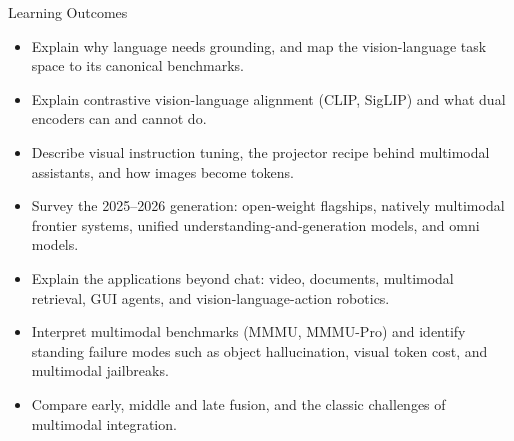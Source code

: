 \begin{frame}{Learning Outcomes}
  \begin{itemize}
    \item Explain why language needs grounding, and map the vision-language task space to its canonical
      benchmarks.
    \item Explain contrastive vision-language alignment (CLIP, SigLIP) and what dual encoders can and
      cannot do.
    \item Describe visual instruction tuning, the projector recipe behind multimodal assistants, and how
      images become tokens.
    \item Survey the 2025--2026 generation: open-weight flagships, natively multimodal frontier systems,
      unified understanding-and-generation models, and omni models.
    \item Explain the applications beyond chat: video, documents, multimodal retrieval, GUI agents, and
      vision-language-action robotics.
    \item Interpret multimodal benchmarks (MMMU, MMMU-Pro) and identify standing failure modes such as
      object hallucination, visual token cost, and multimodal jailbreaks.
    \item Compare early, middle and late fusion, and the classic challenges of multimodal integration.
  \end{itemize}
\end{frame}
